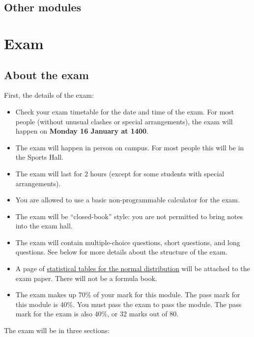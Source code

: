\documentclass[
  letterpaper,
]{report}
\providecommand{\tightlist}{%
  \setlength{\itemsep}{0pt}\setlength{\parskip}{0pt}}\usepackage{longtable,booktabs,array}
\theoremstyle{definition}
\theoremstyle{definition}
\theoremstyle{remark}
\begin{document}
\hypertarget{other-modules}{%
\section{Other modules}\label{other-modules}}

\hypertarget{L22-exam}{%
\chapter{Exam}\label{L22-exam}}

\hypertarget{about-the-exam}{%
\section{About the exam}\label{about-the-exam}}

First, the details of the exam:

\begin{itemize}
\tightlist
\item
  Check your exam timetable for the date and time of the exam. For most
  people (without unusual clashes or special arrangements), the exam
  will happen on \textbf{Monday 16 January at 1400}.
\item
  The exam will happen in person on campus. For most people this will be
  in the Sports Hall.
\item
  The exam will last for 2 hours (except for some students with special
  arrangements).
\item
  You are allowed to use a basic non-programmable calculator for the
  exam.
\item
  The exam will be ``closed-book'' style: you are not permitted to bring
  notes into the exam hall.
\item
  The exam will contain multiple-choice questions, short questions, and
  long questions. See below for more details about the structure of the
  exam.
\item
  A page of
  \href{https://mpaldridge.github.io/math1710/stat-tab.pdf}{statistical
  tables for the normal distribution} will be attached to the exam
  paper. There will not be a formula book.
\item
  The exam makes up 70\% of your mark for this module. The pass mark for
  this module is 40\%. You must pass the exam to pass the module. The
  pass mark for the exam is also 40\%, or 32 marks out of 80.
\end{itemize}

The exam will be in three sections:
\end{document}
